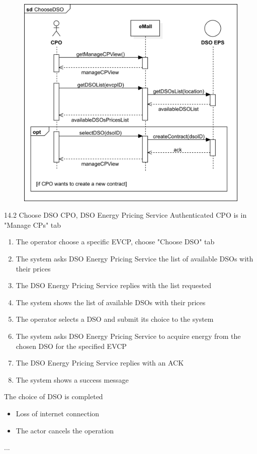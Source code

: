 \usecase
{
    \begin{figure}[H]
        \centering
        \includegraphics[scale=0.9]{src/sequence_diagram/retrievePrices&chooseDSO.png}
    \end{figure}
}
{14.2}
{Choose DSO} %
{CPO, DSO Energy Pricing Service} %
{Authenticated CPO is in "Manage CPs" tab} %
{ %
    \begin{enumerate}
        \item The operator choose a specific EVCP, choose "Choose DSO" tab
        \item The system asks DSO Energy Pricing Service the list of available DSOs with their prices
        \item The DSO Energy Pricing Service replies with the list requested
        \item The system shows the list of available DSOs with their prices
        \item The operator selects a DSO and submit its choice to the system
        \item The system asks DSO Energy Pricing Service to acquire energy from the chosen DSO for the specified EVCP
        \item The DSO Energy Pricing Service replies with an ACK
        \item The system shows a success message
    \end{enumerate}
}
{The choice of DSO is completed} %
{ %
    \begin{itemize}
        \item Loss of internet connection
        \item The actor cancels the operation
    \end{itemize}
}
{ %
    ...
}

